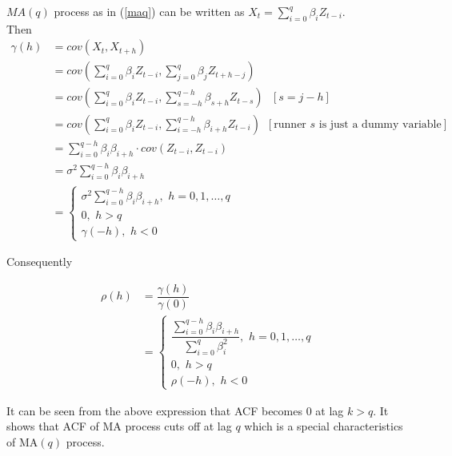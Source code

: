 \documentclass[11pt, a4paper]{article}
\numberwithin{equation}{section}
\theoremstyle{definition}
\begin{document}
$MA(q)$ process as in (\ref{maq}) can be written as $X_t = \sum \limits_{i = 0}^{q} \beta_i Z_{t-i}$. \\

Then
\begin{align*}
\gamma(h) &= cov(X_t, X_{t+h}) \\[0.25em]
&= cov \left(\sum \limits_{i = 0}^{q} \beta_i Z_{t-i}, \sum \limits_{j = 0}^{q} \beta_j Z_{t+h-j} \right) \\[0.25em]
&= cov \left(\sum \limits_{i = 0}^{q} \beta_i Z_{t-i}, \sum \limits_{s = -h}^{q-h} \beta_{s+h} Z_{t-s} \right) \,\,\,\, [s = j-h] \\[0.25em]
&= cov \left(\sum \limits_{i = 0}^{q} \beta_i Z_{t-i}, \sum \limits_{i = -h}^{q-h} \beta_{i+h} Z_{t-i} \right) \,\,\, [\text{runner } s \text{ is just a dummy variable}]\\[0.25em]
&= \sum \limits_{i = 0}^{q - h} \beta_{i}\beta_{i+h} \cdot cov(Z_{t-i}, Z_{t-i}) \\[0.25em]
&= \sigma^2 \sum \limits_{i = 0}^{q - h} \beta_{i}\beta_{i+h} \\[0.25em]
&= \begin{cases}
\sigma^2 \sum \limits_{i = 0}^{q - h} \beta_{i}\beta_{i+h}, \,\, h = 0, 1, \ldots, q \\[0.25em]
0, \,\, h > q \\[0.5em]
\gamma(-h), \,\, h < 0
\end{cases}
\end{align*}

\vspace{0.25cm}

Consequently

\begin{align*}
\rho(h) &= \dfrac{\gamma(h)}{\gamma(0)} \\[0.35em]
&= \begin{cases} 
\dfrac{\sum \limits_{i = 0}^{q - h} \beta_{i}\beta_{i+h}}{\sum \limits_{i = 0}^{q} \beta_{i}^{2}}, \,\, h = 0, 1, \ldots, q \\[1em]
0, \,\, h > q \\[0.5em]
\rho(-h), \,\, h < 0
\end{cases}
\end{align*}

\smallpencil \hspace{0.1cm} It can be seen from the above expression that ACF becomes $0$ at lag $k > q$. It shows that ACF of MA process cuts off at lag $q$ which is a special characteristics of MA$(q)$ process.
\end{document}
